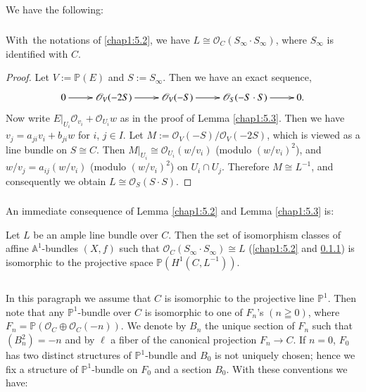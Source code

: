 \subsection{}\label{chap1:5.4}
We have the following:

\subsubsection{}\label{chap1:5.4.1}
\begin{lemma*}
  With\pageoriginale\ the notations of \ref{chap1:5.2}, we have $L\cong
  \mathscr{O}_{C}(S_{\infty}\cdot S_{\infty})$, where $S_{\infty}$ is
  identified with $C$.
\end{lemma*}

\begin{proof}
Let $V:=\mathbb{P}(E)$ and $S:=S_{\infty}$. Then we have an exact
sequence,
\[
\xymatrix{0 \ar[r]& \mathscr{O}_{V}(-2S) \ar[r] & \mathscr{O}_{V}(-S)\ar[r] & 
\mathscr{O}_{S}(-S\cdot S) \ar[r] & 0 .
}
\]
Now write $E|_{U_{i}} \mathscr{O}_{v_{i}}+\mathscr{O}_{U_{i}}w$ as in the proof of
Lemma \ref{chap1:5.3}. Then we have $v_{j}=a_{ji}v_{i}+b_{ji}w$ for $i$,
$j\in I$. Let $M:=\mathscr{O}_{V}(-S)/\mathscr{O}_{V}(-2S)$, which is
viewed as a line bundle on $S\cong C$. Then $M|_{U_{i}}\cong
\mathscr{O}_{U_{i}}(w/v_{i})$ (modulo $(w/v_{i})^{2}$), and
$w/v_{j}=a_{ij}(w/v_{i})$ (modulo $(w/v_{i})^{2}$) on $U_{i}\cap
U_{j}$. Therefore $M\cong L^{-1}$, and consequently we obtain $L\cong
\mathscr{O}_{S}(S\cdot S)$.
\end{proof}

\subsubsection{}\label{chap1:5.4.2}
An immediate consequence of Lemma \ref{chap1:5.2} and Lemma \ref{chap1:5.3}
is:

\begin{lemma*}
Let $L$ be an ample line bundle over $C$. Then the set of isomorphism
classes of affine $\mathbb{A}^{1}$-bundles $(X,f)$ such that
$\mathscr{O}_{C}(S_{\infty}\cdot S_{\infty})\cong L$ (\cf \ref{chap1:5.2}
and \ref{chap1:5.4.1}) is isomorphic to the projective space
$\mathbb{P}(H^{1}(C,L^{-1}))$. 
\end{lemma*}

\subsection{}\label{chap1:5.5}
In this paragraph we assume that $C$ is isomorphic to the projective
line $\mathbb{P}^{1}$. Then note that any $\mathbb{P}^{1}$-bundle over
$C$ is isomorphic to one of $F_{n}$'s $(n\geqq 0)$, where
$F_{n}=\mathbb{P}(\mathscr{O}_{C}\oplus \mathscr{O}_{C}(-n))$. We
denote by $B_{n}$ the unique section of $F_{n}$ such that
$(B^{2}_{n})=-n$ and by $\ell$ a fiber of the canonical projection
$F_{n}\to C$. If $n=0$, $F_{0}$ has two distinct structures of
$\mathbb{P}^{1}$-bundle and $B_{0}$ is not uniquely chosen; hence we
fix a structure of $\mathbb{P}^{1}$-bundle on $F_{0}$ and a section
$B_{0}$. With these conventions we have:

